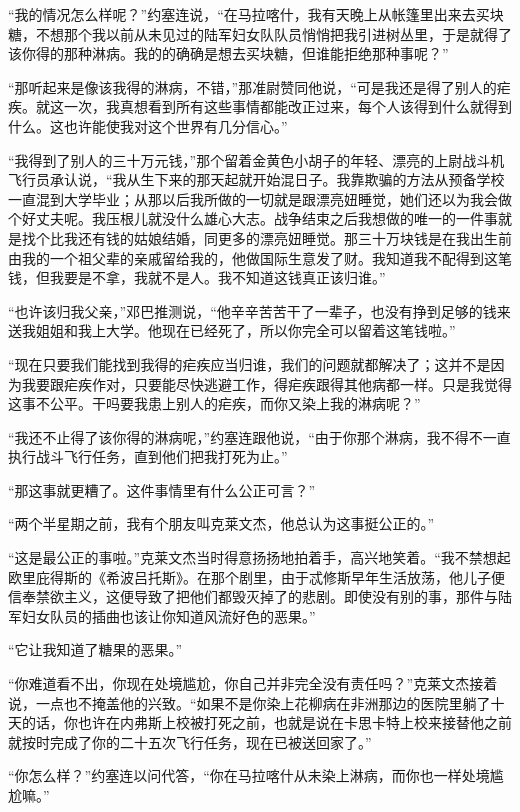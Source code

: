     “我的情况怎么样呢？”约塞连说，“在马拉喀什，我有天晚上从帐篷里出来去买块糖，不想那个我以前从未见过的陆军妇女队队员悄悄把我引进树丛里，于是就得了该你得的那种淋病。我的的确确是想去买块糖，但谁能拒绝那种事呢？”

    “那听起来是像该我得的淋病，不错，”那准尉赞同他说，“可是我还是得了别人的疟疾。就这一次，我真想看到所有这些事情都能改正过来，每个人该得到什么就得到什么。这也许能使我对这个世界有几分信心。”

    “我得到了别人的三十万元钱，”那个留着金黄色小胡子的年轻、漂亮的上尉战斗机飞行员承认说，“我从生下来的那天起就开始混日子。我靠欺骗的方法从预备学校一直混到大学毕业；从那以后我所做的一切就是跟漂亮妞睡觉，她们还以为我会做个好丈夫呢。我压根儿就没什么雄心大志。战争结束之后我想做的唯一的一件事就是找个比我还有钱的姑娘结婚，同更多的漂亮妞睡觉。那三十万块钱是在我出生前由我的一个祖父辈的亲戚留给我的，他做国际生意发了财。我知道我不配得到这笔钱，但我要是不拿，我就不是人。我不知道这钱真正该归谁。”

    “也许该归我父亲，”邓巴推测说，“他辛辛苦苦干了一辈子，也没有挣到足够的钱来送我姐姐和我上大学。他现在已经死了，所以你完全可以留着这笔钱啦。”
 


    “现在只要我们能找到我得的疟疾应当归谁，我们的问题就都解决了；这并不是因为我要跟疟疾作对，只要能尽快逃避工作，得疟疾跟得其他病都一样。只是我觉得这事不公平。干吗要我患上别人的疟疾，而你又染上我的淋病呢？”

    “我还不止得了该你得的淋病呢，”约塞连跟他说，“由于你那个淋病，我不得不一直执行战斗飞行任务，直到他们把我打死为止。”

    “那这事就更糟了。这件事情里有什么公正可言？”

    “两个半星期之前，我有个朋友叫克莱文杰，他总认为这事挺公正的。”

    “这是最公正的事啦。”克莱文杰当时得意扬扬地拍着手，高兴地笑着。“我不禁想起欧里庇得斯的《希波吕托斯》。在那个剧里，由于忒修斯早年生活放荡，他儿子便信奉禁欲主义，这便导致了把他们都毁灭掉了的悲剧。即使没有别的事，那件与陆军妇女队员的插曲也该让你知道风流好色的恶果。”

    “它让我知道了糖果的恶果。”

    “你难道看不出，你现在处境尴尬，你自己并非完全没有责任吗？”克莱文杰接着说，一点也不掩盖他的兴致。“如果不是你染上花柳病在非洲那边的医院里躺了十天的话，你也许在内弗斯上校被打死之前，也就是说在卡思卡特上校来接替他之前就按时完成了你的二十五次飞行任务，现在已被送回家了。”

    “你怎么样？”约塞连以问代答，“你在马拉喀什从未染上淋病，而你也一样处境尴尬嘛。”

